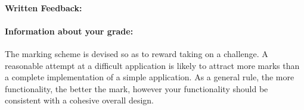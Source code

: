 \documentclass[letterpaper,11pt]{../resources/texMemo}
\begin{document}
\maketitle

\paragraph{Written Feedback:}






\paragraph{Information about your grade:} The marking scheme is devised so as to reward taking on a challenge. A reasonable attempt at a difficult application is likely to attract more marks than a complete implementation of a simple application. As a general rule, the more functionality, the better the mark, however your functionality should be consistent with a cohesive overall design.
\end{document}

